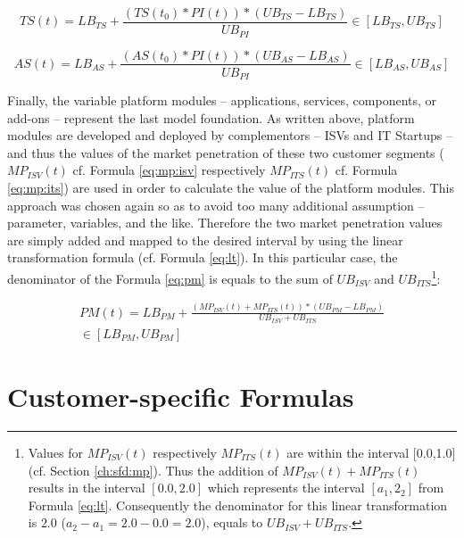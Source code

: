 \begin{equation}\label{eq:ts}
	TS(t) = LB_{TS} +  \frac{(TS(t_0) * PI(t)) * (UB_{TS} - LB_{TS})}{UB_{PI}} \in [LB_{TS},UB_{TS}]
\end{equation}

\begin{equation}\label{eq:as}
	AS(t) = LB_{AS} +  \frac{(AS(t_0) * PI(t)) * (UB_{AS} - LB_{AS})}{UB_{PI}} \in [LB_{AS},UB_{AS}]
\end{equation} 

Finally, the variable platform modules -- applications, services, components, or add-ons -- represent the last model foundation. As written above, platform modules are developed and deployed by complementors -- \acp{ISV} and \ac{IT} Startups -- and thus the values of the market penetration of these two customer segments ($MP_{ISV}(t)$ cf. Formula \ref{eq:mp:isv} respectively $MP_{ITS}(t)$ cf. Formula \ref{eq:mp:its}) are used in order to calculate the value of the platform modules. This approach was chosen again so as to avoid too many additional assumption -- parameter, variables, and the like. Therefore the two market penetration values are simply added and mapped to the desired interval by using the linear transformation formula (cf. Formula \ref{eq:lt}). In this particular case, the denominator of the Formula \ref{eq:pm} is equals to the sum of $UB_{ISV}$ and $UB_{ITS}$\footnote{Values for $MP_{ISV}(t)$ respectively $MP_{ITS}(t)$ are within the interval [0.0,1.0] (cf. Section \ref{ch:sfd:mp}). Thus the addition of $MP_{ISV}(t) + MP_{ITS}(t)$ results in the interval $[0.0,2.0]$ which represents the interval $[a_1,2_2]$ from Formula \ref{eq:lt}. Consequently the denominator for this linear transformation is $2.0$ ($a_2 - a_1 = 2.0 - 0.0 = 2.0$), equals to $UB_{ISV} + UB_{ITS}$.}:

\begin{eqnarray}\label{eq:pm}
	PM(t) = LB_{PM} + \frac{(MP_{ISV}(t) + MP_{ITS}(t)) * (UB_{PM} - LB_{PM})}{UB_{ISV} + UB_{ITS}} \nonumber \\ \in [LB_{PM},UB_{PM}]
\end{eqnarray}

\section{Customer-specific Formulas}\label{ch:sfd:csf}

